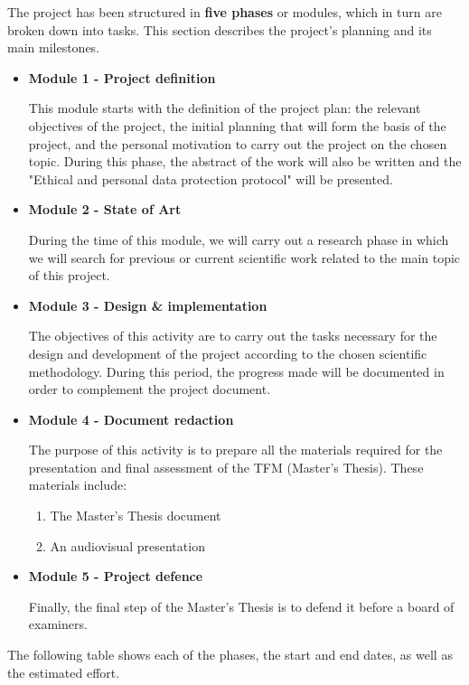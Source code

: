 The project has been structured in \textbf{five phases} or modules, which in turn are broken down into tasks. This section describes the project's planning and its main milestones. 
\begin{itemize}
    \item \textbf{Module 1 - Project definition} 
    
    This module starts with the definition of the project plan: the relevant objectives of the project, the initial planning that will form the basis of the project, and the personal motivation to carry out the project on the chosen topic. During this phase, the abstract of the work will also be written and the "Ethical and personal data protection protocol" will be presented.
    \item \textbf{Module 2 - State of Art}
    
    During the time of this module, we will carry out a research phase in which we will search for previous or current scientific work related to the main topic of this project.
    \item \textbf{Module 3 - Design \& implementation}
    
    The objectives of this activity are to carry out the tasks necessary for the design and development of the project according to the chosen scientific methodology. During this period, the progress made will be documented in order to complement the project document. 
    \item \textbf{Module 4 - Document redaction}
    
    The purpose of this activity is to prepare all the materials required for the presentation and final assessment of the TFM (Master's Thesis). These materials include:
    
    \begin{enumerate}
        \item The Master's Thesis document
        \item An audiovisual presentation
    \end{enumerate}

    \item \textbf{Module 5 - Project defence}
    
    Finally, the final step of the Master's Thesis is to defend it before a board of examiners.
\end{itemize}

The following table shows each of the phases, the start and end dates, as well as the estimated effort.


